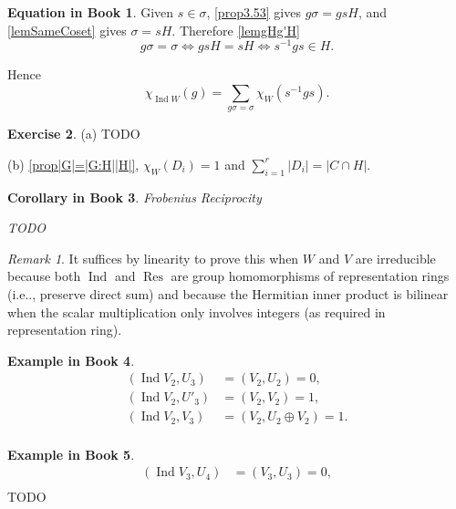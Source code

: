 \documentclass[12pt, letterpaper]{article}
\makeatletter
\newcommand{\Res}{\operatorname{Res}}
\newcommand{\Ind}{\operatorname{Ind}}
\newcommand\ie{i.e\@ifnextchar.{}{.\@}}
\newcommand{\red}[1]{{\color{red} #1}}
\newcommand{\card}[1]{\left\lvert #1 \right\rvert}
\theoremstyle{definition}
\theoremstyle{remark}
\newtheorem*{rem*}{Remark}
\theoremstyle{definition}
\newtheorem{exe}{Exercise}[section]
\newtheorem{exam}[exe]{Example in Book}
\newtheorem{eq}[exe]{Equation in Book}
\theoremstyle{plain}
\newtheorem{ccor}[exe]{Corollary in Book}
\numberwithin{equation}{section}
\makeatother
\begin{document}
	\begin{eq}
		Given $s\in\sigma$, \autoref{prop3.53} gives $g\sigma=gsH$,
		and  \autoref{lemSameCoset} gives $\sigma=sH$.
		Therefore \autoref{lemgHg'H}
		\[g\sigma=\sigma \iff gsH=sH \iff s^{-1}gs\in H.\]
		
		Hence
		\[\chi_{\Ind W}(g)=\sum_{g\sigma=\sigma}\chi_W(s^{-1}gs).\]
	\end{eq}

	\begin{exe}
		(a) \red{TODO}
		
		(b) \autoref{prop|G|=|G:H||H|}, $\chi_W(D_i)=1$ and $\sum_{i=1}^r\card{D_i}=\card{C\cap H}$.
	\end{exe}

	\begin{ccor}
		Frobenius Reciprocity
		
		\red{TODO}
	\end{ccor}
	\begin{rem*}
		It suffices by linearity to prove this when $W$ and $V$ are irreducible
		because both $\Ind$ and $\Res$ are group homomorphisms of representation rings
		(\ie, preserve direct sum) and because the Hermitian inner product is bilinear
		when the scalar multiplication only involves integers (as required in representation ring).
	\end{rem*}

	\begin{exam}
		\[\begin{aligned}
			(\Ind V_2,U_3)&=(V_2,U_2)=0,\\
			(\Ind V_2,U'_3)&=(V_2,V_2)=1,\\
			(\Ind V_2,V_3)&=(V_2,U_2\oplus V_2)=1.\\
		\end{aligned} \]
	\end{exam}

	\begin{exam}
		\[\begin{aligned}
			(\Ind V_3,U_4)&=(V_3,U_3)=0,\\
		\end{aligned}\]
		\red{TODO}
	\end{exam}
	
\end{document}

